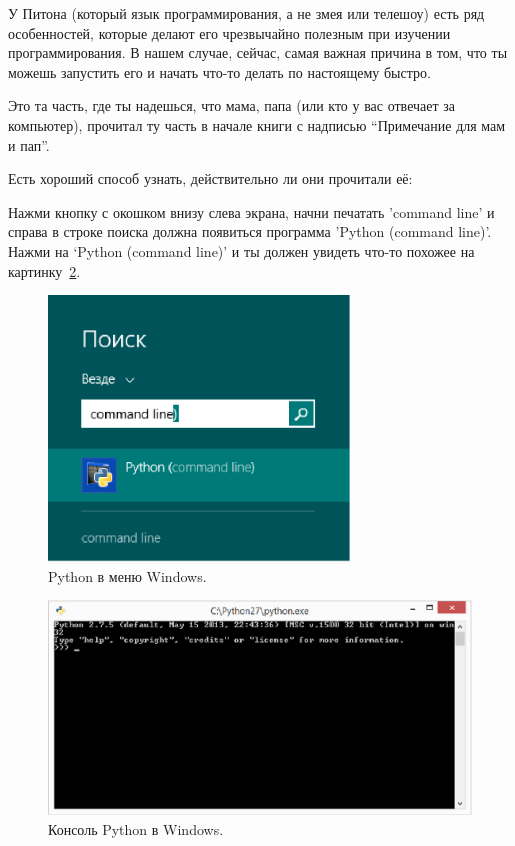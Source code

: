 У Питона (который язык программирования, а не змея или телешоу) есть ряд особенностей, которые делают его чрезвычайно полезным при изучении программирования. В нашем случае, сейчас, самая важная причина в том, что ты можешь запустить его и начать что-то делать по настоящему быстро.

Это та часть, где ты надешься, что мама, папа (или кто у вас отвечает за компьютер), прочитал ту часть в начале книги с надписью ``Примечание для мам и пап''.

\noindent
Есть хороший способ узнать, действительно ли они прочитали её:

\begin{WINDOWS}
Нажми кнопку с окошком внизу слева экрана, начни печатать 'command line' и справа в строке поиска должна появиться программа 'Python (command line)'. Нажми на `Python (command line)' и ты должен увидеть что-то похожее на картинку~\ref{fig2}.

\begin{figure}
\begin{center}
\includegraphics[width=80mm]{figure1.eps}
\end{center}
\caption{Python в меню Windows.}\label{fig1}
\end{figure}

\begin{figure}
\begin{center}
\includegraphics[width=135mm]{figure2.eps}
\end{center}
\caption{Консоль Python в Windows.}\label{fig2}
\end{figure}
\end{WINDOWS}

